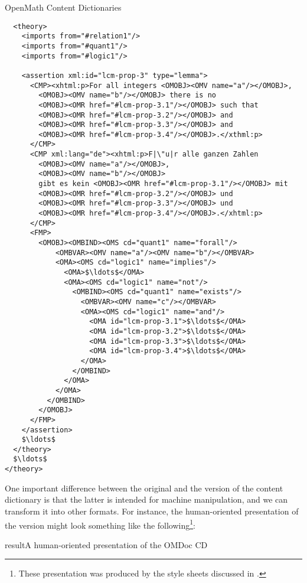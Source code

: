 \begin{tchapter}[id=omcds]{OpenMath Content Dictionaries}
\begin{lstlisting}
  <theory>
    <imports from="#relation1"/>
    <imports from="#quant1"/>
    <imports from="#logic1"/>

    <assertion xml:id="lcm-prop-3" type="lemma">
      <CMP><xhtml:p>For all integers <OMOBJ><OMV name="a"/></OMOBJ>, 
        <OMOBJ><OMV name="b"/></OMOBJ> there is no 
        <OMOBJ><OMR href="#lcm-prop-3.1"/></OMOBJ> such that 
        <OMOBJ><OMR href="#lcm-prop-3.2"/></OMOBJ> and 
        <OMOBJ><OMR href="#lcm-prop-3.3"/></OMOBJ> and 
        <OMOBJ><OMR href="#lcm-prop-3.4"/></OMOBJ>.</xthml:p>
      </CMP>
      <CMP xml:lang="de"><xhtml:p>F|\"u|r alle ganzen Zahlen 
        <OMOBJ><OMV name="a"/></OMOBJ>, 
        <OMOBJ><OMV name="b"/></OMOBJ> 
        gibt es kein <OMOBJ><OMR href="#lcm-prop-3.1"/></OMOBJ> mit   
        <OMOBJ><OMR href="#lcm-prop-3.2"/></OMOBJ> und 
        <OMOBJ><OMR href="#lcm-prop-3.3"/></OMOBJ> und 
        <OMOBJ><OMR href="#lcm-prop-3.4"/></OMOBJ>.</xhtml:p>
      </CMP>
      <FMP>
        <OMOBJ><OMBIND><OMS cd="quant1" name="forall"/>
            <OMBVAR><OMV name="a"/><OMV name="b"/></OMBVAR>
            <OMA><OMS cd="logic1" name="implies"/>
              <OMA>$\ldots$</OMA>
              <OMA><OMS cd="logic1" name="not"/>
                <OMBIND><OMS cd="quant1" name="exists"/>
                  <OMBVAR><OMV name="c"/></OMBVAR>
                  <OMA><OMS cd="logic1" name="and"/>
                    <OMA id="lcm-prop-3.1">$\ldots$</OMA>
                    <OMA id="lcm-prop-3.2">$\ldots$</OMA>
                    <OMA id="lcm-prop-3.3">$\ldots$</OMA>
                    <OMA id="lcm-prop-3.4">$\ldots$</OMA>
                  </OMA>
                </OMBIND>
              </OMA>
            </OMA>
          </OMBIND>
        </OMOBJ>
      </FMP>
    </assertion> 
    $\ldots$
  </theory>
  $\ldots$
</theory>
\end{lstlisting}

\noindent One important difference between the original and the
{\omdoc} version of the {\openmath} content dictionary is that the
latter is intended for machine manipulation, and we can transform it
into other formats. For instance, the human-oriented presentation of
the {\omdoc} version might look something like the
following\footnote{These presentation was
  produced by the style sheets discussed in
  {}.}:\newpage\thisbottomragged

\begin{myfig}{result}{A human-oriented presentation of the OMDoc CD\vspace{-12pt}}
\hspace*{-12pt}
\end{myfig}
\end{tchapter}
